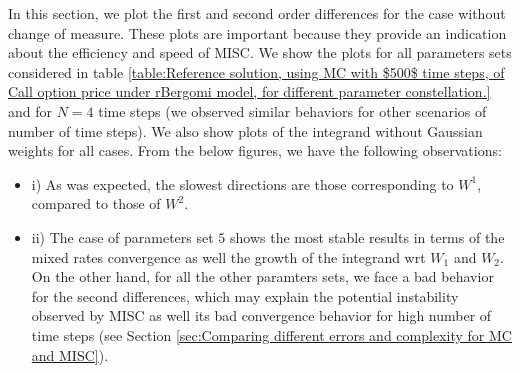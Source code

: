 \documentclass[11pt]{article}
\begin{document}
In this section, we plot the first and second order differences for the case without change of measure. These plots are important because they provide an indication about the efficiency and speed of MISC. We show the plots for all parameters sets considered in table \ref{table:Reference solution, using MC with $500$ time steps, of Call option price under rBergomi model, for different parameter constellation.}  and for  $N=4$ time steps (we observed similar behaviors for other scenarios of number of time steps). We also show plots of the integrand without Gaussian weights for all cases.  From the below figures, we have the following observations:
\begin{itemize}
	\item i) As was expected, the slowest directions are those corresponding to $W^1$, compared to those of   $W^2$.
	
	\item ii) The case of parameters set $5$ shows the most stable results in terms of the mixed rates convergence as well the growth of the integrand wrt $W_1$ and $W_2$. On the other hand, for all the other paramters sets, we face a bad behavior for the second differences,  which may explain the potential instability observed by MISC as well its bad convergence behavior for high number of time steps (see Section \ref{sec:Comparing different  errors and complexity for MC and MISC}). 
\end{itemize}
\end{document}
